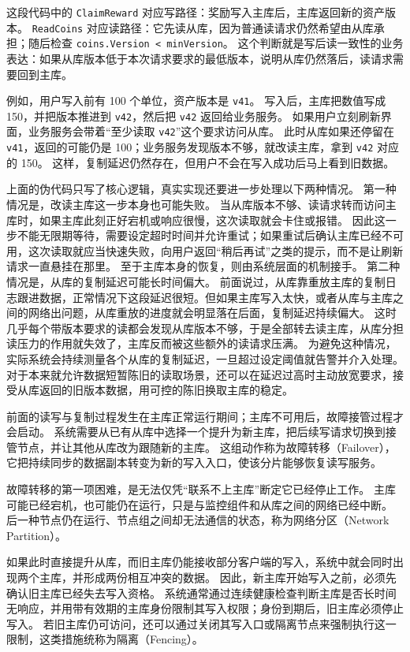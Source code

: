 这段代码中的 \texttt{ClaimReward} 对应写路径：奖励写入主库后，主库返回新的资产版本。
\texttt{ReadCoins} 对应读路径：它先读从库，因为普通读请求仍然希望由从库承担；随后检查 \texttt{coins.Version < minVersion}。
这个判断就是写后读一致性的业务表达：如果从库版本低于本次请求要求的最低版本，说明从库仍然落后，读请求需要回到主库。

例如，用户写入前有 100 个单位，资产版本是 \texttt{v41}。
写入后，主库把数值写成 150，并把版本推进到 \texttt{v42}，然后把 \texttt{v42} 返回给业务服务。
如果用户立刻刷新界面，业务服务会带着“至少读取 \texttt{v42}”这个要求访问从库。
此时从库如果还停留在 \texttt{v41}，返回的可能仍是 100；业务服务发现版本不够，就改读主库，拿到 \texttt{v42} 对应的 150。
这样，复制延迟仍然存在，但用户不会在写入成功后马上看到旧数据。

上面的伪代码只写了核心逻辑，真实实现还要进一步处理以下两种情况。
第一种情况是，改读主库这一步本身也可能失败。
当从库版本不够、读请求转而访问主库时，如果主库此刻正好宕机或响应很慢，这次读取就会卡住或报错。
因此这一步不能无限期等待，需要设定超时时间并允许重试；如果重试后确认主库已经不可用，这次读取就应当快速失败，向用户返回“稍后再试”之类的提示，而不是让刷新请求一直悬挂在那里。
至于主库本身的恢复，则由系统层面的机制接手。
第二种情况是，从库的复制延迟可能长时间偏大。
前面说过，从库靠重放主库的复制日志跟进数据，正常情况下这段延迟很短。但如果主库写入太快，或者从库与主库之间的网络出问题，从库重放的进度就会明显落在后面，复制延迟持续偏大。
这时几乎每个带版本要求的读都会发现从库版本不够，于是全部转去读主库，从库分担读压力的作用就失效了，主库反而被这些额外的读请求压满。
为避免这种情况，实际系统会持续测量各个从库的复制延迟，一旦超过设定阈值就告警并介入处理。
对于本来就允许数据短暂陈旧的读取场景，还可以在延迟过高时主动放宽要求，接受从库返回的旧版本数据，用可控的陈旧换取主库的稳定。

前面的读写与复制过程发生在主库正常运行期间；主库不可用后，故障接管过程才会启动。
系统需要从已有从库中选择一个提升为新主库，把后续写请求切换到接管节点，并让其他从库改为跟随新的主库。
这组动作称为故障转移（Failover），它把持续同步的数据副本转变为新的写入入口，使该分片能够恢复读写服务。

故障转移的第一项困难，是无法仅凭“联系不上主库”断定它已经停止工作。
主库可能已经宕机，也可能仍在运行，只是与监控组件和从库之间的网络已经中断。
后一种节点仍在运行、节点组之间却无法通信的状态，称为网络分区（Network Partition）。

如果此时直接提升从库，而旧主库仍能接收部分客户端的写入，系统中就会同时出现两个主库，并形成两份相互冲突的数据。
因此，新主库开始写入之前，必须先确认旧主库已经失去写入资格。
系统通常通过连续健康检查判断主库是否长时间无响应，并用带有效期的主库身份限制其写入权限；身份到期后，旧主库必须停止写入。
若旧主库仍可访问，还可以通过关闭其写入口或隔离节点来强制执行这一限制，这类措施统称为隔离（Fencing）。

